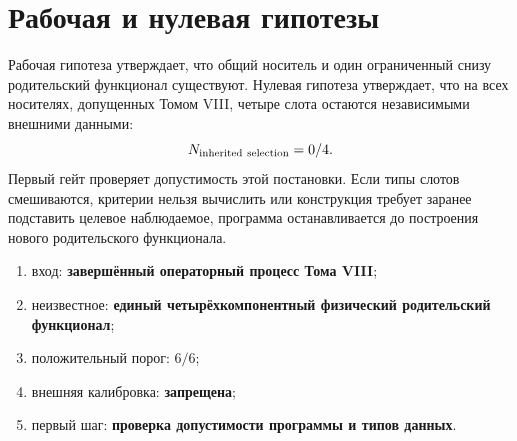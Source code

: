 \section{Рабочая и нулевая гипотезы}

Рабочая гипотеза утверждает, что общий носитель и один ограниченный снизу
родительский функционал существуют. Нулевая гипотеза утверждает, что на всех носителях,
допущенных Томом VIII, четыре слота остаются независимыми внешними данными:
\begin{equation}
 N_{\rm inherited\ selection}=0/4.
 \label{eq:v9-intro-inherited-ledger}
\end{equation}
Первый гейт проверяет допустимость этой постановки. Если типы слотов
смешиваются, критерии нельзя вычислить или конструкция требует заранее
подставить целевое наблюдаемое, программа останавливается до построения
нового родительского функционала.

\begin{protocol}\begin{enumerate}
\item вход: \textbf{завершённый операторный процесс Тома VIII};
\item неизвестное: \textbf{единый четырёхкомпонентный физический родительский функционал};
\item положительный порог: \textbf{$6/6$};
\item внешняя калибровка: \textbf{запрещена};
\item первый шаг: \textbf{проверка допустимости программы и типов данных}.
\end{enumerate}\end{protocol}